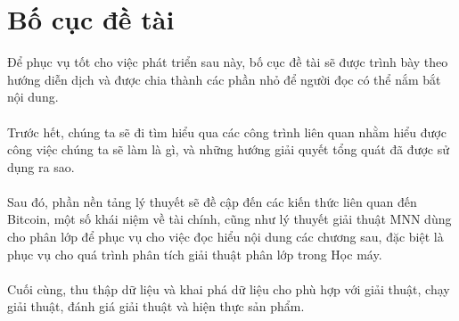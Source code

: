 \section{Bố cục đề tài}
Để phục vụ tốt cho việc phát triển sau này, bố cục đề tài sẽ được trình bày 
theo hướng diễn dịch và được chia thành các phần nhỏ để người đọc có thể nắm 
bắt nội dung.\\\\
Trước hết, chúng ta sẽ đi tìm hiểu qua các công trình liên quan nhằm hiểu được 
công việc chúng ta sẽ làm là gì, và những hướng giải quyết tổng quát đã được 
sử dụng ra sao.\\\\
Sau đó, phần nền tảng lý thuyết sẽ đề cập đến các kiến thức liên quan đến Bitcoin, một số 
khái niệm về tài chính, cũng như lý thuyết giải thuật MNN dùng cho phân lớp để 
phục vụ cho việc đọc hiểu nội dung các chương sau, đặc biệt là phục vụ cho quá 
trình phân tích giải thuật phân lớp trong Học máy.\\\\
Cuối cùng, thu thập dữ liệu và khai phá dữ liệu cho phù hợp với giải thuật, 
chạy giải thuật, đánh giá giải thuật và hiện thực sản phẩm.
